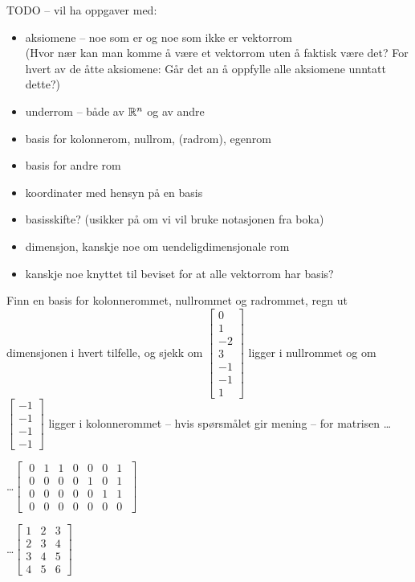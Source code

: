 

\linje
TODO --
vil ha oppgaver med:
\begin{itemize}
\item aksiomene -- noe som er og noe som ikke er vektorrom\\
(Hvor nær kan man komme å være et vektorrom uten å faktisk være det?
 For hvert av de åtte aksiomene: Går det an å oppfylle alle aksiomene unntatt dette?)
\item underrom -- både av $\mathbb{R}^n$ og av andre
\item basis for kolonnerom, nullrom, (radrom), egenrom
\item basis for andre rom
\item koordinater med hensyn på en basis
\item basisskifte?  (usikker på om vi vil bruke notasjonen fra boka)
\item dimensjon, kanskje noe om uendeligdimensjonale rom
\item kanskje noe knyttet til beviset for at alle vektorrom har basis?
\end{itemize}
\linje


\begin{oppgave}
Finn en basis for kolonnerommet, nullrommet og radrommet, regn ut dimensjonen i hvert tilfelle, og sjekk om $\begin{bmatrix}
0\\
1\\
-2\\
3\\
-1\\
-1\\
1
\end{bmatrix}$ ligger i nullrommet og om $\begin{bmatrix}
-1\\
-1\\
-1\\
-1
\end{bmatrix}$ ligger i kolonnerommet -- hvis spørsmålet gir mening -- for matrisen \ldots

\begin{punkt}
\ldots$\begin{bmatrix}
\;0 & 1 & 1 & 0 & 0 & 0 & 1\;\\
\;0 & 0 & 0 & 0 & 1 & 0 & 1\;\\
\;0 & 0 & 0 & 0 & 0 & 1 & 1\;\\
\;0 & 0 & 0 & 0 & 0 & 0 & 0\;
\end{bmatrix}$ 
\end{punkt}

\begin{punkt}
\ldots$\begin{bmatrix}
	1 & 2 & 3\\
	2 & 3 & 4\\
	3 & 4 & 5\\
	4 & 5 & 6
	\end{bmatrix}$ 
\end{punkt}


\end{oppgave}

